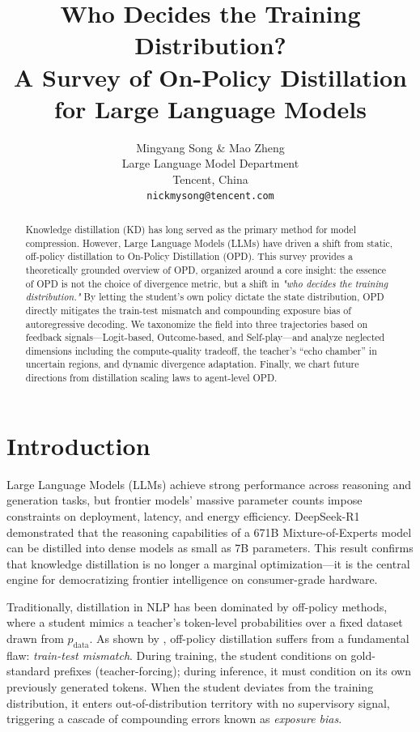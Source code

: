 \documentclass{article} %
\title{Who Decides the Training Distribution? \\ A Survey of On-Policy Distillation for Large Language Models}
\author{Mingyang Song \& Mao Zheng \\
Large Language Model Department \\Tencent, China\\
\texttt{nickmysong@tencent.com}}
\newcommand{\pdata}{p_{\mathrm{data}}}
\begin{document}
\ifcolmsubmission
\linenumbers
\fi

\maketitle


\begin{abstract}
Knowledge distillation (KD) has long served as the primary method for model compression. However, Large Language Models (LLMs) have driven a shift from static, off-policy distillation to On-Policy Distillation (OPD). This survey provides a theoretically grounded overview of OPD, organized around a core insight: the essence of OPD is not the choice of divergence metric, but a shift in \textit{"who decides the training distribution."}  By letting the student's own policy dictate the state distribution, OPD directly mitigates the train-test mismatch and compounding exposure bias of autoregressive decoding.
We taxonomize the field into three trajectories based on feedback signals---Logit-based, Outcome-based, and Self-play---and analyze neglected dimensions including the compute-quality tradeoff, the teacher's ``echo chamber'' in uncertain regions, and dynamic divergence adaptation. Finally, we chart future directions from distillation scaling laws to agent-level OPD.
\end{abstract}

\section{Introduction}
\label{sec:intro}

Large Language Models (LLMs) achieve strong performance across reasoning and generation tasks, but frontier models' massive parameter counts impose constraints on deployment, latency, and energy efficiency. DeepSeek-R1 \citep{2501.12948} demonstrated that the reasoning capabilities of a 671B Mixture-of-Experts model can be distilled into dense models as small as 7B parameters. This result confirms that knowledge distillation is no longer a marginal optimization---it is the central engine for democratizing frontier intelligence on consumer-grade hardware.

Traditionally, distillation in NLP has been dominated by off-policy methods, where a student mimics a teacher's token-level probabilities over a fixed dataset drawn from $\pdata$. As shown by \citet{2305.15717}, off-policy distillation suffers from a fundamental flaw: \textit{train-test mismatch}. During training, the student conditions on gold-standard prefixes (teacher-forcing); during inference, it must condition on its own previously generated tokens. When the student deviates from the training distribution, it enters out-of-distribution territory with no supervisory signal, triggering a cascade of compounding errors known as \textit{exposure bias}. 
\end{document}
